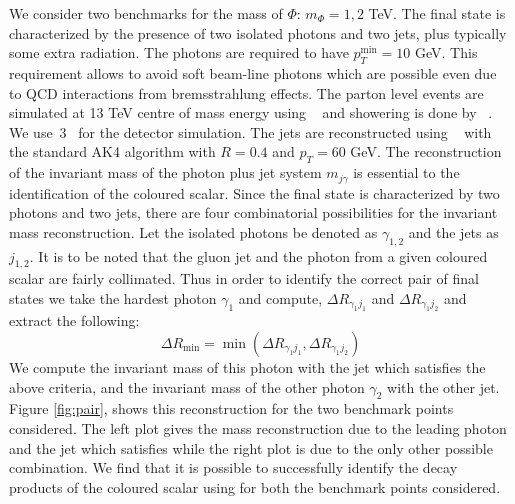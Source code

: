 We consider two benchmarks for the mass of $\Phi$: $m_\Phi=1,2$ TeV. The final state is characterized by 
the presence of two isolated photons and two jets, plus typically some extra radiation. The photons are required to have $p^{\min}_T=10$ GeV. 
This requirement allows to avoid soft beam-line photons which are possible even due to QCD interactions from bremsstrahlung effects.
The parton level events are simulated at 13 TeV centre of mass energy using \madgraph~\cite{Alwall:2014hca} and showering is done by ~\cite{Sjostrand:2007gs}. We use \delphes\,3~\cite{deFavereau:2013fsa} for the detector simulation.
The jets are reconstructed using \fastjet~\cite{Alwall:2014hca} with the standard AK4 algorithm with $R=0.4$ and $p_T=60$ GeV.
The reconstruction of the invariant mass of the photon plus jet system $m_{j\gamma}$ is essential to the identification of the coloured scalar.
Since the final state is characterized by two photons and two jets, there are four combinatorial possibilities for the invariant mass reconstruction. 
Let the isolated photons be denoted as $\gamma_{1,2}$ and the jets as $j_{1,2}.$
It is to be noted that the gluon jet and the photon from a given coloured scalar are fairly collimated. Thus in order to identify the correct pair of final 
states we take the hardest photon $\gamma_1$ and compute, $\Delta R_{\gamma_1 j_1}$ and $\Delta R_{\gamma_1 j_2}$ and extract the 
following:
   \begin{equation}
   \Delta R_{\min}=\min(\Delta R_{\gamma_1 j_1},\Delta R_{\gamma_1 j_2})
  \label{eq:deltaR}
   \end{equation}
We compute the invariant mass of this photon with the jet which satisfies the above criteria, and the invariant mass of the other photon $\gamma_2$ with 
the other jet. Figure \ref{fig:pair}, shows this reconstruction for the two benchmark points considered. The left plot gives the mass reconstruction due to the 
leading photon and the jet which satisfies  while the right plot is due to the only other possible combination. We find that it is possible to 
successfully identify the decay products of the coloured scalar using  for both the benchmark points considered.
